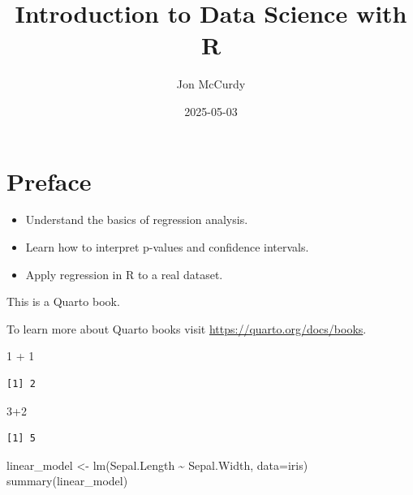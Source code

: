 \documentclass[
  letterpaper,
  DIV=11,
  numbers=noendperiod]{scrreprt}
\title{Introduction to Data Science with R}
\author{Jon McCurdy}
\date{2025-05-03}
\newenvironment{Shaded}{\begin{snugshade}}{\end{snugshade}}
\newcommand{\AttributeTok}[1]{\textcolor[rgb]{0.40,0.45,0.13}{#1}}
\newcommand{\DecValTok}[1]{\textcolor[rgb]{0.68,0.00,0.00}{#1}}
\newcommand{\FunctionTok}[1]{\textcolor[rgb]{0.28,0.35,0.67}{#1}}
\newcommand{\NormalTok}[1]{\textcolor[rgb]{0.00,0.23,0.31}{#1}}
\newcommand{\OtherTok}[1]{\textcolor[rgb]{0.00,0.23,0.31}{#1}}
\newcommand{\SpecialCharTok}[1]{\textcolor[rgb]{0.37,0.37,0.37}{#1}}
\providecommand{\tightlist}{%
  \setlength{\itemsep}{0pt}\setlength{\parskip}{0pt}}
\renewcommand*\contentsname{Table of contents}
\newcommand\contentsname{Table of contents}
\begin{document}
\maketitle

\renewcommand*\contentsname{Table of contents}
{
\hypersetup{linkcolor=}
\setcounter{tocdepth}{2}
\tableofcontents
}


\chapter*{Preface}\label{preface}


\begin{itemize}
\tightlist
\item
  Understand the basics of regression analysis.
\item
  Learn how to interpret p-values and confidence intervals.
\item
  Apply regression in R to a real dataset.
\end{itemize}

This is a Quarto book.

To learn more about Quarto books visit
\url{https://quarto.org/docs/books}.

\begin{Shaded}
\begin{Highlighting}[]
\DecValTok{1} \SpecialCharTok{+} \DecValTok{1}
\end{Highlighting}
\end{Shaded}

\begin{verbatim}
[1] 2
\end{verbatim}

\begin{Shaded}
\begin{Highlighting}[]
\DecValTok{3}\SpecialCharTok{+}\DecValTok{2}
\end{Highlighting}
\end{Shaded}

\begin{verbatim}
[1] 5
\end{verbatim}

\begin{Shaded}
\begin{Highlighting}[]
\NormalTok{linear\_model }\OtherTok{\textless{}{-}} \FunctionTok{lm}\NormalTok{(Sepal.Length }\SpecialCharTok{\textasciitilde{}}\NormalTok{ Sepal.Width, }\AttributeTok{data=}\NormalTok{iris)}
\FunctionTok{summary}\NormalTok{(linear\_model)}
\end{Highlighting}
\end{Shaded}
\end{document}
